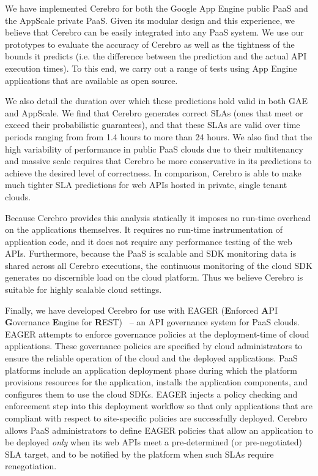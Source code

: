 We have implemented Cerebro for both the Google App Engine public PaaS and 
the AppScale private PaaS. Given its modular design and this experience, 
we believe that Cerebro can be easily integrated into any PaaS system.
We use our prototypes to evaluate the accuracy of Cerebro 
as well as the tightness
of the bounds it predicts (i.e. the difference between the prediction and 
the actual API execution times). To this end, we carry out a range of tests
 using App Engine applications that are available as open source.  

We also detail the duration over which 
these predictions hold valid in both GAE and AppScale.  
We find that Cerebro generates correct SLAs (ones that meet or exceed their
probabilistic guarantees), and that these SLAs are valid over time periods ranging from
from 1.4 hours to more than 24 hours.  
We also find that the high variability of performance in public PaaS clouds due to their multitenancy
and massive scale requires that Cerebro be more conservative in its predictions 
to achieve the desired level of correctness. In comparison, Cerebro is able to make
much tighter SLA predictions for web APIs hosted in private, single tenant clouds.

Because Cerebro provides this 
analysis statically it imposes no run-time overhead on the applications
themselves. It requires no run-time instrumentation of application code,
and it does not require any performance testing of the web APIs.
Furthermore, because the PaaS is scalable and SDK monitoring data is 
shared across all Cerebro executions, the continuous monitoring of the
cloud SDK generates no discernible load on the cloud platform.
Thus we believe Cerebro is suitable for highly scalable cloud
settings.

Finally, we have developed Cerebro for use with EAGER (\textbf{E}nforced
\textbf{A}PI \textbf{G}overnance \textbf{E}ngine for
\textbf{R}EST)~\cite{eager-fop15} --
an API governance system for PaaS clouds. EAGER attempts to enforce
governance policies at the deployment-time of cloud applications. These governance
policies are specified by cloud administrators to ensure the reliable
operation of the cloud and the deployed applications. PaaS
platforms include an application deployment phase during which the platform provisions
resources for the application, installs the application components, and
configures them to use the cloud SDKs. EAGER injects a policy checking and
enforcement step into this deployment workflow so that only applications that
are compliant with respect to site-specific policies are successfully deployed. 
Cerebro allows
PaaS administrators to define
EAGER policies that allow an application to be deployed \textit{only} when its
web APIs meet a pre-determined (or pre-negotiated) SLA target, and to be
notified by the platform when such SLAs require renegotiation.

